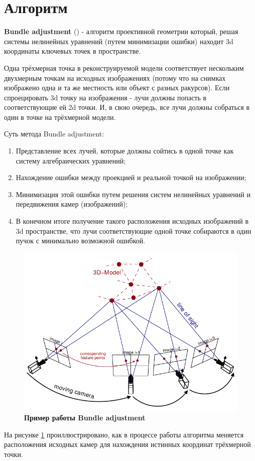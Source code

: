 \section{Алгоритм }

\textbf{Bundle adjustment} () - алгоритм проективной геометрии который, решая системы нелинейных уравнений (путем минимизации ошибки) находит 3d координаты ключевых точек в пространстве.

Одна трёхмерная точка в реконструируемой модели соответствует нескольким двухмерным точкам на исходных изображениях (потому что на снимках изображено одна и та же местность или объект с разных ракурсов). Если спроецировать 3d точку на изображения - лучи должны попасть в соответствующие ей 2d точки. И, в свою очередь, все лучи должны собраться в один  в точке на трёхмерной модели.

Суть метода Bundle adjustment:
\begin{enumerate}
    \item Представление всех лучей, которые должны сойтись в одной точке как систему алгебраических уравнений;
    \item Нахождение ошибки между проекцией и реальной точкой на изображении;
    \item Минимизация этой ошибки путем решения систем нелинейных уравнений и передвижения камер (изображений);
    \item В конечном итоге получение такого расположения исходных изображений в 3d пространстве, что лучи соответствующие одной точке собираются в один пучок с минимально возможной ошибкой.
\end{enumerate}

\begin{figure}[h]
    \centering
    \includegraphics[width=1\textwidth]{images/bundle_adjustment.png}
    \caption{\textbf{Пример работы Bundle adjustment}}
    \label{fig:ba}
\end{figure}

На рисунке \ref{fig:ba} проиллюстрировано, как в процессе работы алгоритма меняется расположения исходных камер для нахождения истинных координат трёхмерной точки.
